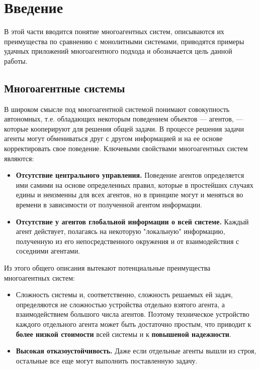 \section*{Введение}					    %

В этой части вводится понятие многоагентных систем, описываются их преимущества по сравнению с монолитными системами, приводятся примеры удачных приложений многоагентного подхода и обозначается цель данной работы.

\subsection*{Многоагентные системы}

В широком смысле под многоагентной системой понимают
совокупность автономных, т.е. обладающих некоторым 
поведением объектов --- агентов, --- которые кооперируют для решения общей задачи. В процессе решения
задачи агенты могут обмениваться друг с другом
информацией и на ее основе корректировать свое поведение. 
Ключевыми свойствами многоагентных систем являются:
\begin{itemize}
\item \textbf{Отсутствие центрального управления.} Поведение
агентов определяется ими самими на основе определенных
правил, которые в простейших случаях едины и неизменны
для всех агентов, но в принципе могут и меняться во
времени в зависимости от полученной агентом информации.
\item \textbf{Отсутствие у агентов глобальной информации о всей
системе.} Каждый агент действует, полагаясь на некоторую
"локальную" информацию, полученную из его
непосредственного окружения и от взаимодействия с  соседними агентами.
\end{itemize}

Из этого общего описания вытекают потенциальные преимущества многоагентных систем:
\begin{itemize}
\item Сложность системы и,
 соответственно, сложность решаемых ей задач, определяются 
 не сложностью устройства 
отдельно взятого агента, а взаимодействием большого числа агентов. 
Поэтому техническое устройство каждого отдельного агента  
может быть достаточно простым, что приводит к \textbf{более низкой стоимости} всей системы и к \textbf{повышеной  надежности}.
\item \textbf{Высокая отказоустойчивость.} Даже если отдельные агенты вышли из строя, остальные все еще могут выполнить поставленную задачу.
\end{itemize}

